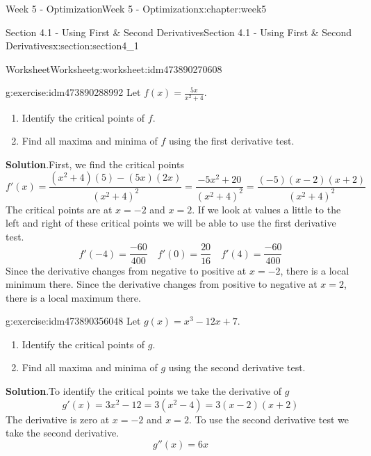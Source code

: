 \documentclass[oneside,10pt,]{book}
\newcommand{\blocktitlefont}{\relax}
\numberwithin{equation}{section}
\begin{document}
\begin{chapterptx}{Week 5 - Optimization}{}{Week 5 - Optimization}{}{}{x:chapter:week5}
\begin{sectionptx}{Section 4.1 - Using First \& Second Derivatives}{}{Section 4.1 - Using First \& Second Derivatives}{}{}{x:section:section4_1}
\begin{worksheet-subsection}{Worksheet}{}{Worksheet}{}{}{g:worksheet:idm473890270608}
\begin{divisionexercise}{1}{}{}{g:exercise:idm473890288992}%
Let \(\displaystyle f(x) = \frac{5x}{x^2+4}\).%
%
\begin{enumerate}[label=(\alph*)]
\item{}Identify the critical points of \(f\).%
\item{}Find all maxima and minima of \(f\) using the first derivative test.%
\end{enumerate}
\textbf{\blocktitlefont Solution}.\hypertarget{g:solution:idm473890288864}{}\quad{}First, we find the critical points%
\begin{equation*}
f'(x) = \frac{(x^2+4)(5)-(5x)(2x)}{(x^2+4)^2} = \frac{-5x^2+20}{(x^2+4)^2} = \frac{(-5)(x-2)(x+2)}{(x^2+4)^2} 
\end{equation*}
The critical points are at \(x=-2\) and \(x=2\). If we look at values a little to the left and right of these critical points we will be able to use the first derivative test.%
\begin{equation*}
f'(-4) = \frac{-60}{400}\quad f'(0)=\frac{20}{16} \quad f'(4) = \frac{-60}{400} 
\end{equation*}
Since the derivative changes from negative to positive at \(x=-2\), there is a local minimum there. Since the derivative changes from positive to negative at \(x=2\), there is a local maximum there.%
\end{divisionexercise}%
\begin{divisionexercise}{2}{}{}{g:exercise:idm473890356048}%
Let \(g(x) = x^3 - 12x + 7\).%
%
\begin{enumerate}[label=(\alph*)]
\item{}Identify the critical points of \(g\).%
\item{}Find all maxima and minima of \(g\) using the second derivative test.%
\end{enumerate}
\textbf{\blocktitlefont Solution}.\hypertarget{g:solution:idm473890224064}{}\quad{}To identify the critical points we take the derivative of \(g\)%
\begin{equation*}
g'(x) = 3x^2-12 = 3(x^2-4)=3(x-2)(x+2)
\end{equation*}
The derivative is zero at \(x=-2\) and \(x=2\). To use the second derivative test we take the second derivative.%
\begin{equation*}
g''(x) = 6x
\end{equation*}

\end{divisionexercise}
\end{worksheet-subsection}
\end{sectionptx}
\end{chapterptx}
\end{document}
